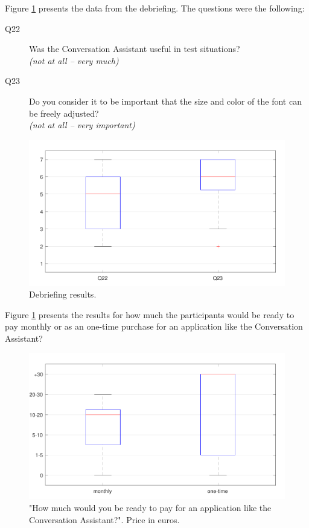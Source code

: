 \documentclass[english, 12pt, a4paper, pdftex, elec, utf8]{aaltothesis}
\begin{document}
Figure \ref{fig:results4} presents the data from the debriefing. The questions were the following:
\begin{description}
	\item[Q22] Was the Conversation Assistant useful in test situations? \\ \textit{(not at all -- very much)}
	\item[Q23] Do you consider it to be important that the size and color of the font can be freely adjusted? \\ \textit{(not at all -- very important)}
\end{description}
\begin{figure}[h!]
	\centering
	\includegraphics[width=\textwidth]{T2_box4.pdf}
	\caption{Debriefing results.}
	\label{fig:results4} 
\end{figure}
Figure \ref{fig:results4} presents the results for how much the participants would be ready to pay monthly or as an one-time purchase for an application like the Conversation Assistant?
\begin{figure}[h!]
	\centering
	\includegraphics[width=\textwidth]{T2_box5.pdf}
	\caption{"How much would you be ready to pay for an application like the Conversation Assistant?". Price in euros.}
	\label{fig:results5} 
\end{figure}
\end{document}
